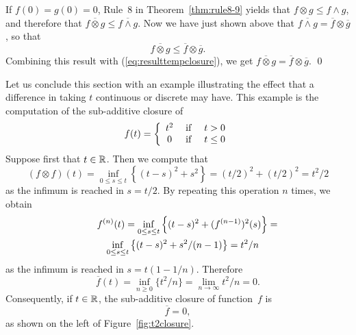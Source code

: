 If $f(0) = g(0) =0$, %
Rule~8 in Theorem~\ref{thm:rule8-9} yields that $f \otimes g \leq f \wedge g$, and therefore
 that $ \overline{f \otimes g} \leq \overline{ f \wedge g } $. Now we have just shown above that
 $\overline{f \wedge g} = \overline{f} \otimes \overline{g}$, so that
 $$ \overline{f \otimes g} \leq \overline{f} \otimes \overline{g}. $$
%
%
 Combining this result with (\ref{eq:resulttempclosure}), we get
 $\overline{f \otimes g} = \overline{f} \otimes \overline{g}$.
\qed

Let us conclude this section with an example illustrating the
effect that a difference in taking $t$ continuous or discrete may
have. This example is the computation of the sub-additive closure
of
$$ f(t) = \left\{ \begin{array}{ccc} t^2 & \mathrm{\; if \; } & t > 0 \\
                    0 & \mathrm{\; if \; } & t \leq 0 \end{array} \right.  $$
Suppose first that $t \in \mathbb{R}$. Then we compute that
$$ (f \otimes f)(t) = \inf_{0 \leq s \leq t} \left\{ (t-s)^2 + s^2 \right\} = (t/2)^2 + (t/2)^2 = t^2/2 $$
as the infimum is reached in $s = t/2$. By repeating this operation $n$ times, we obtain
\begin{eqnarray*} \lefteqn{f^{(n)}(t)  = \inf_{0 \leq s \leq t} \left\{ (t-s)^2 +
(f^{(n-1)})^2(s) \right\} = } \\
 & &  \inf_{0 \leq s \leq t} \left\{
 (t-s)^2 + s^2/(n-1) \right\}  = t^2/n
 \end{eqnarray*}
as the infimum is reached in $s = t(1-1/n)$. Therefore
$$ \overline{f} (t) = \inf_{n \geq 0} \{ t^2/n \} = \lim_{n \rightarrow \infty} t^2/n = 0.$$
Consequently, if $t \in \mathbb{R}$, the sub-additive closure of function~$f$ is
$$  \overline{f} = 0, $$
as shown on the left of Figure~\ref{fig:t2closure}.
\begin{figure}[!htbp]
 \end{figure}

